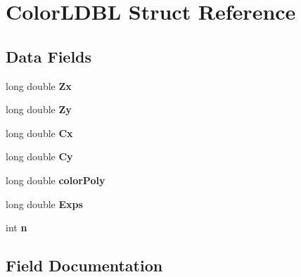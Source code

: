 \hypertarget{struct_color_l_d_b_l}{}\section{Color\+L\+D\+BL Struct Reference}
\label{struct_color_l_d_b_l}
\subsection*{Data Fields}
\begin{DoxyCompactItemize}
\item 
\mbox{\label{struct_color_l_d_b_l_a4b4b1a35d4396ec2dbbaad51f9ff4079}} 
long double {\bfseries Zx}
\item 
\mbox{\label{struct_color_l_d_b_l_a51a0c2cb239dcadc284963eb8a5ba423}} 
long double {\bfseries Zy}
\item 
\mbox{\label{struct_color_l_d_b_l_a9f083a843499dd55048426903ba90f6f}} 
long double {\bfseries Cx}
\item 
\mbox{\label{struct_color_l_d_b_l_adc2ea68700059c1af12b0f49e19e6687}} 
long double {\bfseries Cy}
\item 
\mbox{\label{struct_color_l_d_b_l_ab83bc1e6d6d0590aa7b5a539cc66c3e2}} 
long double {\bfseries color\+Poly}
\item 
\mbox{\label{struct_color_l_d_b_l_a1b70845f196a0f1d127570d8a926f1ce}} 
long double {\bfseries Exps}
\item 
\mbox{\label{struct_color_l_d_b_l_a075068bb3c5fa4e120df4f54a95f69bd}} 
int {\bfseries n}
\end{DoxyCompactItemize}


\subsection{Field Documentation}
\mbox{\label{struct_color_l_d_b_l_ab83bc1e6d6d0590aa7b5a539cc66c3e2}} 

